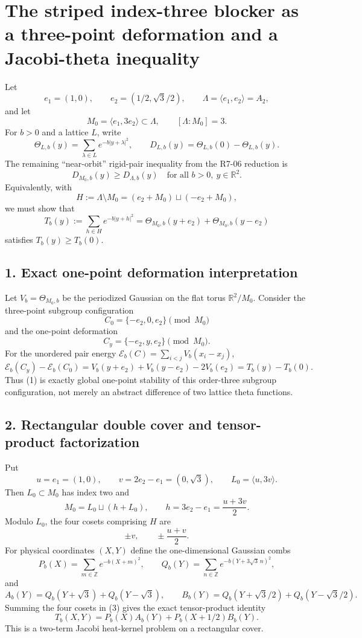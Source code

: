 \section*{The striped index-three blocker as a three-point deformation and a Jacobi-theta inequality}

Let
\[
 e_1=(1,0),\qquad e_2=(1/2,\sqrt3/2),\qquad \Lambda=\langle e_1,e_2\rangle=A_2,
\]
and let
\[
 M_0=\langle e_1,3e_2\rangle\subset\Lambda,\qquad [\Lambda:M_0]=3.
\]
For $b>0$ and a lattice $L$, write
\[
 \Theta_{L,b}(y)=\sum_{\lambda\in L}e^{-b|y+\lambda|^2},\qquad
 D_{L,b}(y)=\Theta_{L,b}(0)-\Theta_{L,b}(y).
\]
The remaining ``near-orbit'' rigid-pair inequality from the R7-06 reduction is
\[
 \boxed{D_{M_0,b}(y)\ge D_{\Lambda,b}(y)\quad\text{for all }b>0,\ y\in\mathbb R^2.}\tag{1}
\]
Equivalently, with
\[
 H:=\Lambda\setminus M_0=(e_2+M_0)\sqcup(-e_2+M_0),
\]
we must show that
\[
 T_b(y):=\sum_{h\in H}e^{-b|y+h|^2}
       =\Theta_{M_0,b}(y+e_2)+\Theta_{M_0,b}(y-e_2)
\]
satisfies $T_b(y)\ge T_b(0)$.

\subsection*{1. Exact one-point deformation interpretation}
Let $V_b=\Theta_{M_0,b}$ be the periodized Gaussian on the flat torus $\mathbb R^2/M_0$.  Consider the three-point subgroup configuration
\[
 C_0=\{-e_2,0,e_2\}\pmod{M_0}
\]
and the one-point deformation
\[
 C_y=\{-e_2,y,e_2\}\pmod{M_0}.
\]
For the unordered pair energy $\mathcal E_b(C)=\sum_{i<j}V_b(x_i-x_j)$,
\[
 \mathcal E_b(C_y)-\mathcal E_b(C_0)
 =V_b(y+e_2)+V_b(y-e_2)-2V_b(e_2)
 =\boxed{T_b(y)-T_b(0)}.\tag{2}
\]
Thus (1) is exactly global one-point stability of this order-three subgroup configuration, not merely an abstract difference of two lattice theta functions.

\subsection*{2. Rectangular double cover and tensor-product factorization}
Put
\[
 u=e_1=(1,0),\qquad v=2e_2-e_1=(0,\sqrt3),\qquad L_0=\langle u,3v\rangle.
\]
Then $L_0\subset M_0$ has index two and
\[
 M_0=L_0\sqcup(h+L_0),\qquad h=3e_2-e_1=\frac{u+3v}{2}.
\]
Modulo $L_0$, the four cosets comprising $H$ are
\[
 \boxed{\pm v,\qquad \pm\frac{u+v}{2}}.\tag{3}
\]
For physical coordinates $(X,Y)$ define the one-dimensional Gaussian combs
\[
 P_b(X)=\sum_{m\in\mathbb Z}e^{-b(X+m)^2},\qquad
 Q_b(Y)=\sum_{n\in\mathbb Z}e^{-b(Y+3\sqrt3\,n)^2},
\]
and
\[
 A_b(Y)=Q_b(Y+\sqrt3)+Q_b(Y-\sqrt3),\qquad
 B_b(Y)=Q_b(Y+\sqrt3/2)+Q_b(Y-\sqrt3/2).
\]
Summing the four cosets in (3) gives the exact tensor-product identity
\[
 \boxed{T_b(X,Y)=P_b(X)A_b(Y)+P_b(X+1/2)B_b(Y).}\tag{4}
\]
This is a two-term Jacobi heat-kernel problem on a rectangular cover.

